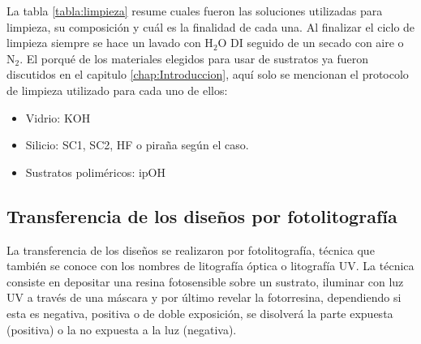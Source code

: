 			La tabla \ref{tabla:limpieza} resume cuales fueron las soluciones utilizadas para limpieza, su composición y cuál es la finalidad de cada una. Al finalizar el ciclo de limpieza siempre se hace un lavado con H$_2$O DI seguido de un secado con aire o N$_2$. El porqué de los materiales elegidos para usar de sustratos ya fueron discutidos en el capitulo \ref{chap:Introduccion}, aquí solo se mencionan el protocolo de limpieza\cite{Franssila2004,Kern1990} utilizado para cada uno de ellos:

				\begin{itemize}
					\item{Vidrio: KOH}
					\item{Silicio: SC1, SC2, HF o piraña según el caso.}
					\item{Sustratos poliméricos: ipOH}
				\end{itemize}

    \subsection{Transferencia de los diseños por fotolitografía}\label{sec:fotolito}

		La transferencia de los diseños se realizaron por fotolitografía, técnica que también se conoce con los nombres de litografía óptica o litografía UV. La técnica consiste en depositar una resina fotosensible sobre un sustrato, iluminar con luz UV a través de una máscara y por último revelar la fotorresina, dependiendo si esta es negativa, positiva o de doble exposición, se disolverá la parte expuesta (positiva) o la no expuesta a la luz (negativa). \cite{Jaeger2001,Franssila2004,Mack2007,Mack2006}
	
